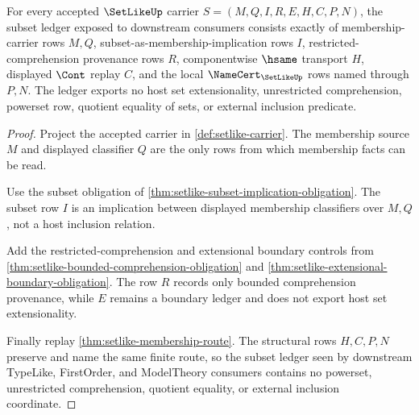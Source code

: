 \begin{theorem}
\label{thm:setlike-subset-ledger-obligation}
For every accepted $\SetLikeUp$ carrier $S=(M,Q,I,R,E,H,C,P,N)$, the subset ledger exposed to downstream consumers consists exactly of membership-carrier rows $M,Q$, subset-as-membership-implication rows $I$, restricted-comprehension provenance rows $R$, componentwise $\hsame$ transport $H$, displayed $\Cont$ replay $C$, and the local $\NameCert_{\SetLikeUp}$ rows named through $P,N$. The ledger exports no host set extensionality, unrestricted comprehension, powerset row, quotient equality of sets, or external inclusion predicate.
\end{theorem}
\begin{proof}
Project the accepted carrier in \autoref{def:setlike-carrier}. The membership source $M$ and displayed classifier $Q$ are the only rows from which membership facts can be read.

Use the subset obligation of \autoref{thm:setlike-subset-implication-obligation}. The subset row $I$ is an implication between displayed membership classifiers over $M,Q$, not a host inclusion relation.

Add the restricted-comprehension and extensional boundary controls from \autoref{thm:setlike-bounded-comprehension-obligation} and \autoref{thm:setlike-extensional-boundary-obligation}. The row $R$ records only bounded comprehension provenance, while $E$ remains a boundary ledger and does not export host set extensionality.

Finally replay \autoref{thm:setlike-membership-route}. The structural rows $H,C,P,N$ preserve and name the same finite route, so the subset ledger seen by downstream TypeLike, FirstOrder, and ModelTheory consumers contains no powerset, unrestricted comprehension, quotient equality, or external inclusion coordinate.
\end{proof}

